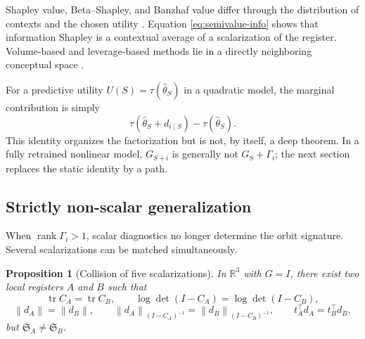 \documentclass[10pt,a4paper]{article}
\newtheorem{proposition}[theorem]{Proposition}
\newcommand{\R}{\mathbb{R}}
\newcommand{\rank}{\operatorname{rank}}
\newcommand{\tr}{\operatorname{tr}}
\newcommand{\norm}[1]{\left\lVert #1\right\rVert}
\newcommand{\Sigreg}{\mathfrak S}
\begin{document}
Shapley value, Beta--Shapley, and Banzhaf value differ through the distribution of contexts and the chosen utility \citep{ghorbani2019,kwon2022,wang2023banzhaf}. Equation \eqref{eq:semivalue-info} shows that information Shapley is a contextual average of a scalarization of the register. Volume-based and leverage-based methods lie in a directly neighboring conceptual space \citep{xu2021volume,mendozasmith2025}.

For a predictive utility $U(S)=\tau(\widehat\theta_S)$ in a quadratic model, the marginal contribution is simply
\[
\tau(\widehat\theta_S+d_{i\mid S})-\tau(\widehat\theta_S).
\]
This identity organizes the factorization but is not, by itself, a deep theorem. In a fully retrained nonlinear model, $G_{S+i}$ is generally not $G_S+\Gamma_i$; the next section replaces the static identity by a path.

\subsection{Strictly non-scalar generalization}
When $\rank\Gamma_i>1$, scalar diagnostics no longer determine the orbit signature. Several scalarizations can be matched simultaneously.

\begin{proposition}[Collision of five scalarizations]
In $\R^3$ with $G=I$, there exist two local registers $A$ and $B$ such that
\begin{equation}
\tr C_A=\tr C_B,
\qquad
\log\det(I-C_A)=\log\det(I-C_B),
\end{equation}
\begin{equation}
\norm{d_A}=\norm{d_B},
\qquad
\norm{d_A}_{(I-C_A)^{-1}}=\norm{d_B}_{(I-C_B)^{-1}},
\qquad
t_A^\top d_A=t_B^\top d_B,
\end{equation}
but $\Sigreg_A\neq\Sigreg_B$.
\end{proposition}
\end{document}
